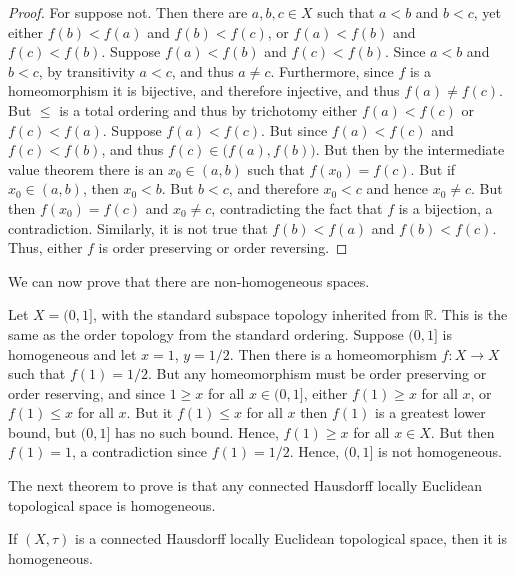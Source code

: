 \documentclass{article}                                                        %
\begin{document}
        \begin{proof}
                For suppose not. Then there are $a,b,c\in{X}$ such that
                $a<b$ and $b<c$, yet either $f(b)<f(a)$ and $f(b)<f(c)$, or
                $f(a)<f(b)$ and $f(c)<f(b)$. Suppose $f(a)<f(b)$ and
                $f(c)<f(b)$. Since $a<b$ and $b<c$, by transitivity $a<c$, and
                thus $a\ne{c}$. Furthermore, since $f$ is a homeomorphism it is
                bijective, and therefore injective, and thus $f(a)\ne{f}(c)$.
                But $\leq$ is a total ordering and thus by trichotomy either
                $f(a)<f(c)$ or $f(c)<f(a)$. Suppose $f(a)<f(c)$. But since
                $f(a)<f(c)$ and $f(c)<f(b)$, and thus
                $f(c)\in\big(f(a),f(b)\big)$. But then by the intermediate value
                theorem there is an $x_{0}\in(a,b)$ such that $f(x_{0})=f(c)$.
                But if $x_{0}\in(a,b)$, then $x_{0}<b$. But $b<c$, and therefore
                $x_{0}<c$ and hence $x_{0}\ne{c}$. But then $f(x_{0})=f(c)$ and
                $x_{0}\ne{c}$, contradicting the fact that $f$ is a bijection,
                a contradiction. Similarly, it is not true that $f(b)<f(a)$ and
                $f(b)<f(c)$. Thus, either $f$ is order preserving or order
                reversing.
        \end{proof}
        We can now prove that there are non-homogeneous spaces.
        \begin{example}
                Let $X=(0,1]$, with the standard subspace topology inherited
                from $\mathbb{R}$. This is the same as the order topology from
                the standard ordering. Suppose $(0,1]$ is homogeneous and let
                $x=1$, $y=1/2$. Then there is a homeomorphism
                $f:X\rightarrow{X}$ such that $f(1)=1/2$. But any homeomorphism
                must be order preserving or order reserving, and since
                $1\geq{x}$ for all $x\in(0,1]$, either $f(1)\geq{x}$ for all
                $x$, or $f(1)\leq{x}$ for all $x$. But it $f(1)\leq{x}$ for all
                $x$ then $f(1)$ is a greatest lower bound, but $(0,1]$ has no
                such bound. Hence, $f(1)\geq{x}$ for all $x\in{X}$. But then
                $f(1)=1$, a contradiction since $f(1)=1/2$. Hence, $(0,1]$ is
                not homogeneous.
        \end{example}
        The next theorem to prove is that any connected Hausdorff locally
        Euclidean topological space is homogeneous.
        \begin{theorem}
                If $(X,\tau)$ is a connected Hausdorff locally Euclidean
                topological space, then it is homogeneous.
        \end{theorem}
\end{document}
